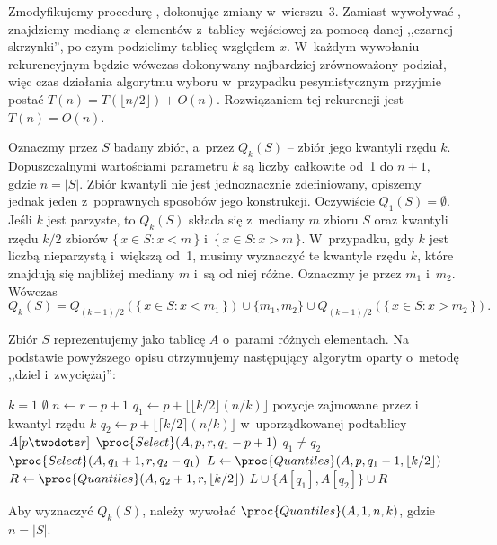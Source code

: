 \exercise %
Zmodyfikujemy procedurę , dokonując zmiany w~wierszu~3. Zamiast wywoływać , znajdziemy medianę $x$ elementów z~tablicy wejściowej za pomocą danej ,,czarnej skrzynki'', po czym podzielimy tablicę względem $x$. W~każdym wywołaniu rekurencyjnym będzie wówczas dokonywany najbardziej zrównoważony podział, więc czas działania algorytmu wyboru w~przypadku pesymistycznym przyjmie postać $T(n)=T(\lfloor n/2\rfloor)+O(n)$. Rozwiązaniem tej rekurencji jest $T(n)=O(n)$.

\exercise %
Oznaczmy przez $S$ badany zbiór, a~przez $Q_k(S)$ -- zbiór jego kwantyli rzędu $k$. Dopuszczalnymi wartościami parametru $k$ są liczby całkowite od~1 do $n+1$, gdzie $n=|S|$. Zbiór kwantyli nie jest jednoznacznie zdefiniowany, opiszemy jednak jeden z~poprawnych sposobów jego konstrukcji. Oczywiście $Q_1(S)=\emptyset$. Jeśli $k$ jest parzyste, to $Q_k(S)$ składa się z~mediany $m$ zbioru $S$ oraz kwantyli rzędu $k/2$ zbiorów $\{\,x\in S:x<m\,\}$ i~$\{\,x\in S:x>m\,\}$. W~przypadku, gdy $k$ jest liczbą nieparzystą i~większą od~1, musimy wyznaczyć te kwantyle rzędu $k$, które znajdują się najbliżej mediany $m$ i~są od niej różne. Oznaczmy je przez $m_1$ i~$m_2$. Wówczas
\[
	Q_k(S) = Q_{(k-1)/2}(\{\,x\in S:x<m_1\,\})\cup\{m_1,m_2\}\cup Q_{(k-1)/2}(\{\,x\in S:x>m_2\,\}).
\]

Zbiór $S$ reprezentujemy jako tablicę $A$ o~parami różnych elementach. Na podstawie powyższego opisu otrzymujemy następujący algorytm oparty o~metodę ,,dziel i~zwyciężaj'':
\begin{codebox}
\li	\If $k=1$
\li		\Then \Return $\emptyset$
		\End
\li	$n\gets r-p+1$
\li	$q_1\gets p+\lfloor\lfloor k/2\rfloor(n/k)\rfloor$ \>\>\>\>\>\>\Comment pozycje zajmowane przez  i~ kwantyl rzędu $k$
\li	$q_2\gets p+\lfloor\lceil k/2\rceil(n/k)\rfloor$ \>\>\>\>\>\>\>w~uporządkowanej podtablicy $A[p\twodots r]$
\li	$\proc{Select}(A,p,r,q_1-p+1)$
\li	\If $q_1\ne q_2$
\li		\Then $\proc{Select}(A,q_1+1,r,q_2-q_1)$ \label{li:quantiles-second-select}
		\End
\li	$L\gets\proc{Quantiles}(A,p,q_1-1,\lfloor k/2\rfloor)$
\li	$R\gets\proc{Quantiles}(A,q_2+1,r,\lfloor k/2\rfloor)$
\li	\Return $L\cup\{A[q_1],A[q_2]\}\cup R$
\end{codebox}
Aby wyznaczyć $Q_k(S)$, należy wywołać $\proc{Quantiles}(A,1,n,k)$, gdzie $n=|S|$.

